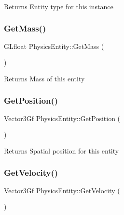 \begin{DoxyReturn}{Returns}
Entity type for this instance 
\end{DoxyReturn}
\mbox{\label{classPhysicsEntity_a07943c4b81878d402b97d1280f8c8ff9}} 
\subsubsection{\texorpdfstring{Get\+Mass()}{GetMass()}}
{\footnotesize\ttfamily G\+Lfloat Physics\+Entity\+::\+Get\+Mass (\begin{DoxyParamCaption}{ }\end{DoxyParamCaption})}

\begin{DoxyReturn}{Returns}
Mass of this entity 
\end{DoxyReturn}
\mbox{\label{classPhysicsEntity_a73d263f4efb4fc87b36493f340d94a97}} 
\subsubsection{\texorpdfstring{Get\+Position()}{GetPosition()}}
{\footnotesize\ttfamily Vector3\+Gf Physics\+Entity\+::\+Get\+Position (\begin{DoxyParamCaption}{ }\end{DoxyParamCaption})}

\begin{DoxyReturn}{Returns}
Spatial position for this entity 
\end{DoxyReturn}
\mbox{\label{classPhysicsEntity_a2064523af6e64719996d505360e37af1}} 
\subsubsection{\texorpdfstring{Get\+Velocity()}{GetVelocity()}}
{\footnotesize\ttfamily Vector3\+Gf Physics\+Entity\+::\+Get\+Velocity (\begin{DoxyParamCaption}{ }\end{DoxyParamCaption})}

